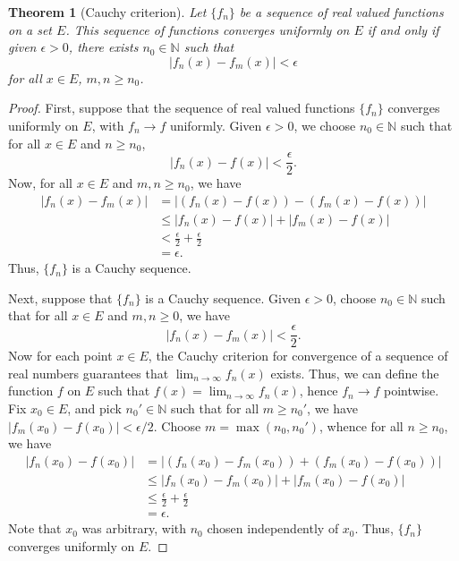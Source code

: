 \documentclass[11pt]{article}
\def\N{\mathbb{N}}
\newtheorem{theorem}{Theorem}[section]
\theoremstyle{definition}
\theoremstyle{remark}
\begin{document}
    \begin{theorem}[Cauchy criterion] \label{theo:cauchy_criterion}
        Let $\{f_n\}$ be a sequence of real valued functions on a set $E$.
        This sequence of functions converges uniformly on $E$ if and only if given
        $\epsilon > 0$, there exists $n_0 \in \N$ such that \[
            |f_n(x) - f_m(x)| < \epsilon
        \] for all $x \in E$, $m, n \geq n_0$.
    \end{theorem} 
    \begin{proof}
        First, suppose that the sequence of real valued functions $\{f_n\}$ converges
        uniformly on $E$, with $f_n \to f$ uniformly. Given $\epsilon > 0$, we choose
        $n_0 \in \N$ such that for all $x \in E$ and $n \geq n_0$, \[
            |f_n(x) - f(x)| < \frac{\epsilon}{2}.
        \] Now, for all $x \in E$ and $m, n \geq n_0$, we have
        \begin{align*}
            |f_n(x) - f_m(x)| &= |(f_n(x) - f(x)) - (f_m(x) - f(x))| \\
            &\leq |f_n(x) - f(x)| + |f_m(x) - f(x)| \\
            & < \frac{\epsilon}{2} + \frac{\epsilon}{2} \\
            &= \epsilon.
        \end{align*}
        Thus, $\{f_n\}$ is a Cauchy sequence.

        Next, suppose that $\{f_n\}$ is a Cauchy sequence. Given $\epsilon > 0$,
        choose $n_0 \in \N$ such that for all $x \in E$ and $m, n \geq 0$, we have \[
            |f_n(x) - f_m(x)| < \frac{\epsilon}{2}.
        \] Now for each point $x \in E$, the Cauchy criterion for convergence of a
        sequence of real numbers guarantees that $\lim_{n \to \infty} f_n(x)$ exists.
        Thus, we can define the function $f$ on $E$ such that $f(x) = \lim_{n \to
        \infty} f_n(x)$, hence $f_n \to f$ pointwise. Fix $x_0 \in E$, and pick $n_0'
        \in \N$ such that for all $m \geq n_0'$, we have $|f_m(x_0) - f(x_0)| <
        \epsilon / 2$. Choose $m = \max(n_0, n_0')$, whence for all $n \geq n_0$, we
        have
        \begin{align*}
            |f_n(x_0) - f(x_0)| &= |(f_n(x_0) - f_m(x_0)) + (f_m(x_0) - f(x_0))| \\
            &\leq |f_n(x_0) - f_m(x_0)| + |f_m(x_0) - f(x_0)| \\
            &\leq \frac{\epsilon}{2} + \frac{\epsilon}{2} \\
            &= \epsilon.
        \end{align*}
        Note that $x_0$ was arbitrary, with $n_0$ chosen independently of $x_0$.
        Thus, $\{f_n\}$ converges uniformly on $E$.
    \end{proof}
    
\end{document}

